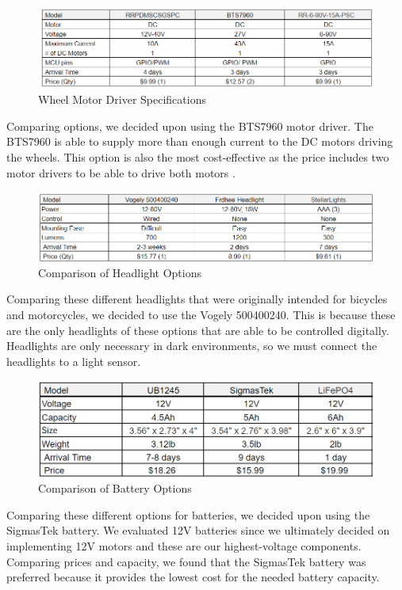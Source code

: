 \begin{figure}[H]
	\centering
	\includegraphics[width=1\textwidth]{./Images/wheel_driver_table.png}
	\caption{\label{fig:wheel_driver}Wheel Motor Driver Specifications}
\end{figure}

\noindent Comparing options, we decided upon using the BTS7960 motor driver. The BTS7960 is able to supply more than enough current to the DC motors driving the wheels. This option is also the most cost-effective as the price includes two motor drivers to be able to drive both motors \cite{RioRand} \cite{Gikfun} \cite{Hobbywing}.\\

\begin{figure}[H]
	\centering
	\includegraphics[width=1\textwidth]{./Images/headlight_table.png}
	\caption{\label{fig:headlights}Comparison of Headlight Options}
\end{figure}

\noindent Comparing these different headlights that were originally intended for bicycles and motorcycles, we decided to use the Vogely ‎500400240. This is because these are the only headlights of these options that are able to be controlled digitally. Headlights are only necessary in dark environments, so we must connect the headlights to a light sensor. \cite{vogely2024} \cite{frdhee2024} \cite{stellarlights2024}\\

\begin{figure}[H]
	\centering
	\includegraphics[width=1\textwidth]{./Images/battery_table.png}
	\caption{\label{fig:batteries}Comparison of Battery Options}
\end{figure}

\noindent Comparing these different options for batteries, we decided upon using the SigmasTek battery. We evaluated 12V batteries since we ultimately decided on implementing 12V motors and these are our highest-voltage components. Comparing prices and capacity, we found that the SigmasTek battery was preferred because it provides the lowest cost for the needed battery capacity. \cite{liftmaster2024} \cite{lifepo42024}\\